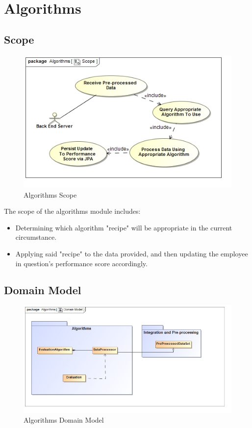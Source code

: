 \documentclass[11pt,a4paper]{article}
\begin{document}
\pagebreak

\section{Algorithms}
\subsection{Scope}
\begin{figure}[H]
	\begin{center}
		\includegraphics[scale=0.75]{../Images/Algorithms_Scope.jpg}
		\caption{Algorithms Scope}
	\end{center}
\end{figure}
The scope of the algorithms module includes:
\begin{itemize}
	\item Determining which algorithm "recipe" will be appropriate in the current circumstance.
	\item Applying said "recipe" to the data provided, and then updating the employee in question's performance score accordingly.
\end{itemize}

\subsection{Domain Model}
\begin{figure}[H]
	\begin{center}
		\includegraphics[scale=0.6]{../Images/Algorithm_Domain.jpg}
		\caption{Algorithms Domain Model}
	\end{center}
\end{figure}
\end{document}
